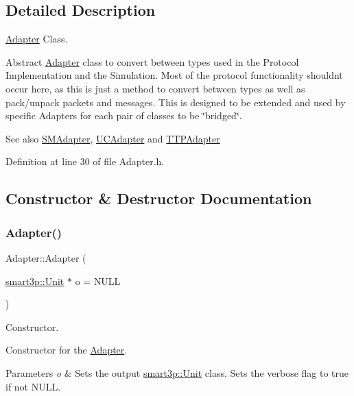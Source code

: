 \subsection{Detailed Description}
\hyperlink{classAdapter}{Adapter} Class. 

Abstract \hyperlink{classAdapter}{Adapter} class to convert between types used in the Protocol Implementation and the Simulation. Most of the protocol functionality shouldn\textquotesingle{}t occur here, as this is just a method to convert between types as well as pack/unpack packets and messages. This is designed to be extended and used by specific Adapters for each pair of classes to be \char`\"{}bridged\char`\"{}. \begin{DoxySeeAlso}{See also}
\hyperlink{classSMAdapter}{S\+M\+Adapter}, \hyperlink{classUCAdapter}{U\+C\+Adapter} and \hyperlink{classTTPAdapter}{T\+T\+P\+Adapter} 
\end{DoxySeeAlso}


Definition at line 30 of file Adapter.\+h.



\subsection{Constructor \& Destructor Documentation}
\mbox{\label{classAdapter_a8c1799a1bd84d52fc7cbd8ebd07734eb}} 
\subsubsection{\texorpdfstring{Adapter()}{Adapter()}}
{\footnotesize\ttfamily Adapter\+::\+Adapter (\begin{DoxyParamCaption}\item[{\hyperlink{classsmart3p_1_1Unit}{smart3p\+::\+Unit} $\ast$}]{o = {\ttfamily NULL} }\end{DoxyParamCaption})}



Constructor. 

Constructor for the \hyperlink{classAdapter}{Adapter}. 
\begin{DoxyParams}{Parameters}
{\em o} & Sets the output \hyperlink{classsmart3p_1_1Unit}{smart3p\+::\+Unit} class. Sets the verbose flag to true if not N\+U\+LL. \\
\hline
\end{DoxyParams}


